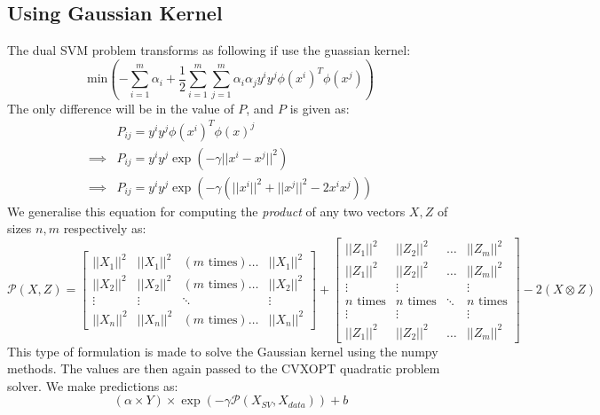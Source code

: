 \documentclass[11pt]{article}
\begin{document}
\subsection{Using Gaussian Kernel}
The dual SVM problem transforms as following if use the guassian kernel:
\begin{equation}
  \text{min}(- \sum_{i=1}^m \alpha_i + \frac{1}{2}\sum_{i=1}^m\sum_{j=1}^m \alpha_i \alpha_j y^i y^j \phi(x^i)^T \phi(x^j))
\end{equation}
The only difference will be in the value of $P$, and $P$ is given as:
\begin{equation}
  \begin{split}
    &P_{ij} = y^i y^j \phi(x^i)^T \phi(x)^j\\
    \implies &P_{ij} = y^i y^j \exp(-\gamma ||x^i - x^j||^2)\\
    \implies &P_{ij} = y^i y^j \exp(-\gamma (||x^i||^2 + ||x^j||^2 - 2 x^i x^j))
  \end{split}
\end{equation}
We generalise this equation for computing the \textit{product} of any two vectors $X, Z$ of sizes $n,m$ respectively as:
\begin{equation}
  \mathcal{P}(X, Z) =
  \begin{bmatrix}
    ||X_1||^2 & ||X_1||^2 & (m \text{ times})\ldots & ||X_1||^2\\
    ||X_2||^2 & ||X_2||^2 & (m \text{ times})\ldots & ||X_2||^2\\
    \vdots & \vdots & \ddots & \vdots\\
    ||X_n||^2 & ||X_n||^2 & (m \text{ times})\ldots & ||X_n||^2
  \end{bmatrix} +
  \begin{bmatrix}
    ||Z_1||^2 & ||Z_2||^2 & \ldots & ||Z_m||^2\\
    ||Z_1||^2 & ||Z_2||^2 & \ldots & ||Z_m||^2\\
    \vdots & \vdots & & \vdots\\
    n\text{ times} & n\text{ times} & \ddots & n\text{ times}\\
    \vdots & \vdots & & \vdots\\
    ||Z_1||^2 & ||Z_2||^2 & \ldots & ||Z_m||^2
  \end{bmatrix} -
  2 (X \otimes Z)
\end{equation}
This type of formulation is made to solve the Gaussian kernel using the numpy methods. The values are then again passed to the CVXOPT quadratic problem solver. We make predictions as:
\begin{equation}
  (\alpha \times Y) \times \exp(-\gamma \mathcal{P}(X_{SV}, X_{data})) + b
\end{equation}
\end{document}
